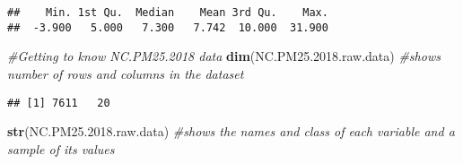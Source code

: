 \documentclass[]{article}
\newenvironment{Shaded}{\begin{snugshade}}{\end{snugshade}}
\newcommand{\KeywordTok}[1]{\textcolor[rgb]{0.13,0.29,0.53}{\textbf{#1}}}
\newcommand{\FloatTok}[1]{\textcolor[rgb]{0.00,0.00,0.81}{#1}}
\newcommand{\CommentTok}[1]{\textcolor[rgb]{0.56,0.35,0.01}{\textit{#1}}}
\newcommand{\OperatorTok}[1]{\textcolor[rgb]{0.81,0.36,0.00}{\textbf{#1}}}
\newcommand{\NormalTok}[1]{#1}
\begin{document}
\begin{Shaded}
\end{Shaded}

\begin{verbatim}
##    Min. 1st Qu.  Median    Mean 3rd Qu.    Max. 
##  -3.900   5.000   7.300   7.742  10.000  31.900
\end{verbatim}

\begin{Shaded}
\begin{Highlighting}[]
\CommentTok{#Getting to know NC.PM25.2018 data}
\KeywordTok{dim}\NormalTok{(NC.PM25.}\FloatTok{2018.}\NormalTok{raw.data) }\CommentTok{#shows number of rows and columns in the dataset}
\end{Highlighting}
\end{Shaded}

\begin{verbatim}
## [1] 7611   20
\end{verbatim}

\begin{Shaded}
\begin{Highlighting}[]
\KeywordTok{str}\NormalTok{(NC.PM25.}\FloatTok{2018.}\NormalTok{raw.data) }\CommentTok{#shows the names and class of each variable and a sample of its values}
\end{Highlighting}
\end{Shaded}
\end{document}
